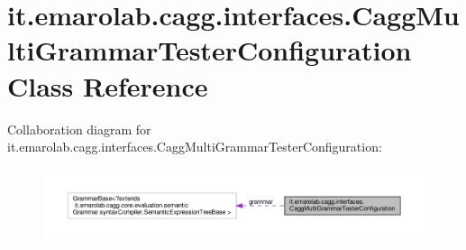 \hypertarget{classit_1_1emarolab_1_1cagg_1_1interfaces_1_1CaggMultiGrammarTesterConfiguration}{\section{it.\-emarolab.\-cagg.\-interfaces.\-Cagg\-Multi\-Grammar\-Tester\-Configuration Class Reference}
\label{classit_1_1emarolab_1_1cagg_1_1interfaces_1_1CaggMultiGrammarTesterConfiguration}
}


Collaboration diagram for it.\-emarolab.\-cagg.\-interfaces.\-Cagg\-Multi\-Grammar\-Tester\-Configuration\-:\nopagebreak
\begin{figure}[H]
\begin{center}
\leavevmode
\includegraphics[width=350pt]{classit_1_1emarolab_1_1cagg_1_1interfaces_1_1CaggMultiGrammarTesterConfiguration__coll__graph}
\end{center}
\end{figure}
